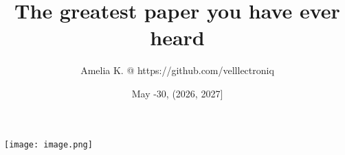 \documentclass{article}
\title{The greatest paper you have ever heard}
\author{Amelia K. @ https://github.com/velllectroniq}
\date{May -30, (2026, 2027]}
\begin{document}
\maketitle
\centering
\texttt{[image: image.png]}
\end{document}
